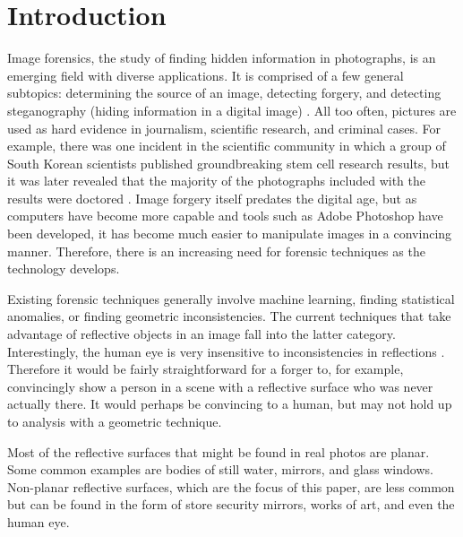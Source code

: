 \chapter{Introduction}





Image forensics, the study of finding hidden information in photographs, is an emerging field with diverse applications. It is comprised of a few general subtopics: determining the source of an image, detecting forgery, and detecting steganography (hiding information in a digital image) \cite{rocha2011}. All too often, pictures are used as hard evidence in journalism, scientific research, and criminal cases. For example, there was one incident in the scientific community in which a group of South Korean scientists published groundbreaking stem cell research results, but it was later revealed that the majority of the photographs included with the results were doctored \cite{rocha2011}. Image forgery itself predates the digital age, but as computers have become more capable and tools such as Adobe Photoshop have been developed, it has become much easier to manipulate images in a convincing manner. Therefore, there is an increasing need for forensic techniques as the technology develops.

Existing forensic techniques generally involve machine learning, finding statistical anomalies, or finding geometric inconsistencies. The current techniques that take advantage of reflective objects in an image fall into the latter category. Interestingly, the human eye is very insensitive to inconsistencies in reflections \cite{farid2010image}. Therefore it would be fairly straightforward for a forger to, for example, convincingly show a person in a scene with a reflective surface who was never actually there. It would perhaps be convincing to a human, but may not hold up to analysis with a geometric technique.

Most of the reflective surfaces that might be found in real photos are planar. Some common examples are bodies of still water, mirrors, and glass windows. Non-planar reflective surfaces, which are the focus of this paper, are less common but can be found in the form of store security mirrors, works of art, and even the human eye.